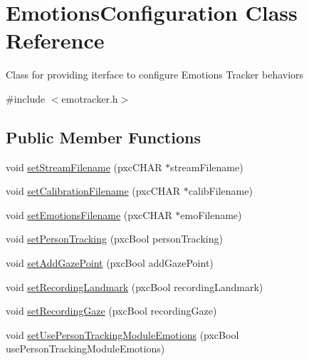 \hypertarget{class_emotions_configuration}{}\section{Emotions\+Configuration Class Reference}
\label{class_emotions_configuration}


Class for providing iterface to configure Emotions Tracker behaviors  




{\ttfamily \#include $<$emotracker.\+h$>$}

\subsection*{Public Member Functions}
\begin{DoxyCompactItemize}
\item 
void \hyperlink{class_emotions_configuration_a59ff9feb080a20721a2ba714fc9f40dc}{set\+Stream\+Filename} (pxc\+C\+H\+AR $\ast$stream\+Filename)
\item 
void \hyperlink{class_emotions_configuration_a4645e007a7b2a9d9c52f020530b401fb}{set\+Calibration\+Filename} (pxc\+C\+H\+AR $\ast$calib\+Filename)
\item 
void \hyperlink{class_emotions_configuration_a7b8cdc24a83960cef6579cc4ce454709}{set\+Emotions\+Filename} (pxc\+C\+H\+AR $\ast$emo\+Filename)
\item 
void \hyperlink{class_emotions_configuration_afa77034583065b49e1ed9bdfe4ad1d77}{set\+Person\+Tracking} (pxc\+Bool person\+Tracking)
\item 
void \hyperlink{class_emotions_configuration_a712005bb21d3745664a9ff1c23466fc3}{set\+Add\+Gaze\+Point} (pxc\+Bool add\+Gaze\+Point)
\item 
void \hyperlink{class_emotions_configuration_a6d50830265d85761f5dd0abfa12d5fcb}{set\+Recording\+Landmark} (pxc\+Bool recording\+Landmark)
\item 
void \hyperlink{class_emotions_configuration_af52d273380cd9392a2ff104b774b5da9}{set\+Recording\+Gaze} (pxc\+Bool recording\+Gaze)
\item 
void \hyperlink{class_emotions_configuration_a1eb27ec836c4151d78a826a50566e3a3}{set\+Use\+Person\+Tracking\+Module\+Emotions} (pxc\+Bool use\+Person\+Tracking\+Module\+Emotions)
\end{DoxyCompactItemize}
